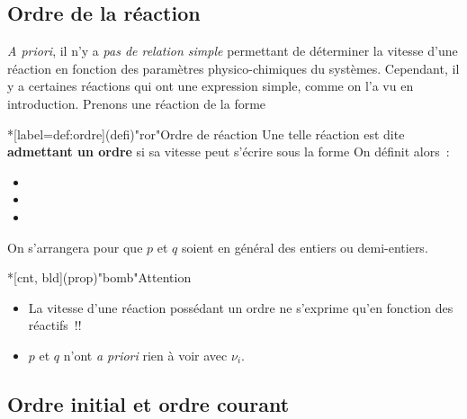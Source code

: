 \documentclass[../../main/main.tex]{subfiles}
\begin{document}
\subsection{Ordre de la réaction}
\textit{A priori}, il n'y a \textit{pas de relation simple} permettant de
déterminer la vitesse d'une réaction en fonction des paramètres
physico-chimiques du systèmes. Cependant, il y a certaines réactions qui ont une
expression simple, comme on l'a vu en introduction. Prenons une réaction de la
forme
\psw{
\[
	a\ce{A} + b\ce{B} = c\ce{C} + d\ce{D}
	\Longleftrightarrow
	\sum_{i=1}^{p} \left| \nu_i \right| {\ce{R}}_i = \sum_{i=p+1}^{N} \nu_i {\ce{P}}_i
\]
}
\vspace{-15pt}
\begin{tcb}*[label=def:ordre](defi)"ror"{Ordre de réaction}
	Une telle réaction est dite \textbf{admettant un ordre} si sa vitesse peut
	s'écrire sous la forme
	\psw{
	\[
		\boxed{v = k[\ce{A}]^p[\ce{B}]^q}
		\Longleftrightarrow
		\boxed{v = k \prod_{i=1}^{p}[{\ce{R}}_i]^{m_i}}
	\]
	}
	On définit alors~:
	\begin{itemize}
		\item {}
		\item {}
		\item {}
	\end{itemize}
	On s'arrangera pour que $p$ et $q$ soient en général des entiers ou
	demi-entiers.
\end{tcb}

\begin{tcb}*[cnt, bld](prop)"bomb"{Attention}
	\begin{itemize}
		\item La vitesse d'une réaction possédant un ordre ne s'exprime qu'en fonction des
		      réactifs~!!
		\item $p$ et $q$ n'ont \textit{a priori} rien à
		      voir avec $\nu_i$.
	\end{itemize}
\end{tcb}

\subsection{Ordre initial et ordre courant}
\end{document}
